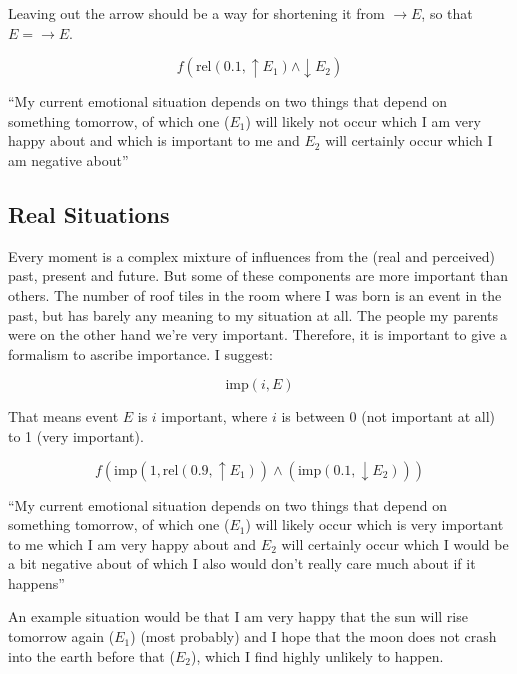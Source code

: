 \documentclass{scrartcl}
\begin{document}
Leaving out the arrow should be a way for shortening it from $\rightarrow E$, so that $E = \rightarrow E$.

\begin{equation} f \left( \textrm{rel}(0.1, \uparrow E_1) \wedge \downarrow E_2 \right) \end{equation}

``My current emotional situation depends on two things that depend on something tomorrow, of which one ($E_1$) will likely not
occur which I am very happy about and which is important to me and $E_2$ will certainly occur which I am negative about''

\subsection{Real Situations}

Every moment is a complex mixture of influences from the (real and perceived) past, present and future. But some
of these components are more important than others. The number of roof tiles in the room where I was born is
an event in the past, but has barely any meaning to my situation at all. The people my parents were on the other
hand we're very important. Therefore, it is important to give a formalism to ascribe importance. I suggest:

\begin{equation} \textrm{imp}(i, E) \end{equation}

That means event $E$ is $i$ important, where $i$ is between 0 (not important at all) to 1 (very important).

\begin{equation} 
	f \left(
		\textrm{imp}\left(
			1, \textrm{rel}\left(
				0.9, \uparrow E_1
			\right)
		\right)
		\wedge
		\left(
			\textrm{imp}\left(
				0.1, \downarrow E_2
			\right)
		\right)
	\right)
\end{equation}

``My current emotional situation depends on two things that depend on something tomorrow, of which one ($E_1$) will likely
occur which is very important to me which I am very happy about and $E_2$ will certainly occur which I would be a bit negative about
of which I also would don't really care much about if it happens''

An example situation would be that I am very happy that the sun will rise tomorrow again ($E_1$) (most probably) and I hope that the moon
does not crash into the earth before that ($E_2$), which I find highly unlikely to happen.
\end{document}
